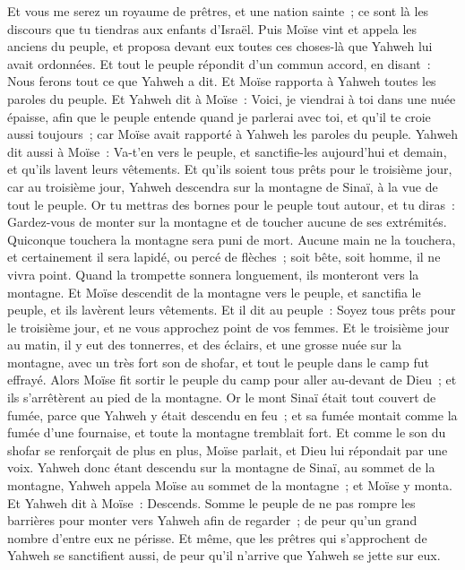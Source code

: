 \begin{multicols}{2}
Et vous me serez un royaume de prêtres, et une nation sainte~; ce sont là les discours que tu tiendras aux enfants d'Israël.
Puis Moïse vint et appela les anciens du peuple, et proposa devant eux toutes ces choses-là que Yahweh lui avait ordonnées.
Et tout le peuple répondit d'un commun accord, en disant~: Nous ferons tout ce que Yahweh a dit. Et Moïse rapporta à Yahweh toutes les paroles du peuple.
Et Yahweh dit à Moïse~: Voici, je viendrai à toi dans une nuée épaisse, afin que le peuple entende quand je parlerai avec toi, et qu'il te croie aussi toujours~; car Moïse avait rapporté à Yahweh les paroles du peuple.
Yahweh dit aussi à Moïse~: Va-t'en vers le peuple, et sanctifie-les aujourd'hui et demain, et qu'ils lavent leurs vêtements.
Et qu'ils soient tous prêts pour le troisième jour, car au troisième jour, Yahweh descendra sur la montagne de Sinaï, à la vue de tout le peuple.
Or tu mettras des bornes pour le peuple tout autour, et tu diras~: Gardez-vous de monter sur la montagne et de toucher aucune de ses extrémités. Quiconque touchera la montagne sera puni de mort.
Aucune main ne la touchera, et certainement il sera lapidé, ou percé de flèches~; soit bête, soit homme, il ne vivra point. Quand la trompette sonnera longuement, ils monteront vers la montagne.
Et Moïse descendit de la montagne vers le peuple, et sanctifia le peuple, et ils lavèrent leurs vêtements.
Et il dit au peuple~: Soyez tous prêts pour le troisième jour, et ne vous approchez point de vos femmes.
Et le troisième jour au matin, il y eut des tonnerres, et des éclairs, et une grosse nuée sur la montagne, avec un très fort son de shofar, et tout le peuple dans le camp fut effrayé.
Alors Moïse fit sortir le peuple du camp pour aller au-devant de Dieu~; et ils s'arrêtèrent au pied de la montagne.
Or le mont Sinaï était tout couvert de fumée, parce que Yahweh y était descendu en feu~; et sa fumée montait comme la fumée d'une fournaise, et toute la montagne tremblait fort.
Et comme le son du shofar se renforçait de plus en plus, Moïse parlait, et Dieu lui répondait par une voix.
Yahweh donc étant descendu sur la montagne de Sinaï, au sommet de la montagne, Yahweh appela Moïse au sommet de la montagne~; et Moïse y monta.
Et Yahweh dit à Moïse~: Descends. Somme le peuple de ne pas rompre les barrières pour monter vers Yahweh afin de regarder~; de peur qu'un grand nombre d'entre eux ne périsse.
Et même, que les prêtres qui s'approchent de Yahweh se sanctifient aussi, de peur qu'il n'arrive que Yahweh se jette sur eux.

\end{multicols}
